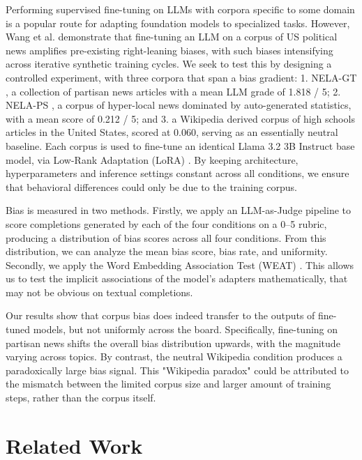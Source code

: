 \documentclass{article}
\begin{document}
Performing supervised fine-tuning on LLMs with corpora specific to some domain is a popular route for adapting foundation models to specialized tasks. 
However, Wang et al. \cite{wang2024bias} demonstrate that fine-tuning an LLM on a corpus of US political news amplifies pre-existing right-leaning biases, with such biases intensifying across iterative synthetic training cycles.  
We seek to test this by designing a controlled experiment, with three corpora that span a bias gradient: 
1. NELA-GT \cite{gruppi2023nela}, a collection of partisan news articles with a mean LLM grade of 1.818 / 5; 
2. NELA-PS \cite{horne2024nelaps}, a corpus of hyper-local news dominated by auto-generated statistics, with a mean score of 0.212 / 5; 
and 3. a Wikipedia \cite{wikimedia} derived corpus of high schools articles in the United States, scored at 0.060, serving as an essentially neutral baseline. 
Each corpus is used to fine-tune an identical Llama 3.2 3B Instruct \cite{dubey2024llama} base model, via Low-Rank Adaptation (LoRA) \cite{hu2021lora}. 
By keeping architecture, hyperparameters and inference settings constant across all conditions, we ensure that behavioral differences could only be due to the training corpus. 

Bias is measured in two methods. 
Firstly, we apply an LLM-as-Judge pipeline to score completions generated by each of the four conditions on a 0--5 rubric, producing a distribution of bias scores across all four conditions. 
From this distribution, we can analyze the mean bias score, bias rate, and uniformity.
Secondly, we apply the Word Embedding Association Test (WEAT) \cite{caliskan2017}.
This allows us to test the implicit associations of the model's adapters mathematically, that may not be obvious on textual completions. 

Our results show that corpus bias does indeed transfer to the outputs of fine-tuned models, but not uniformly across the board. 
Specifically, fine-tuning on partisan news shifts the overall bias distribution upwards, with the magnitude varying across topics. 
By contrast, the neutral Wikipedia condition produces a paradoxically large bias signal. 
This "Wikipedia paradox" could be attributed to the mismatch between the limited corpus size and larger amount of training steps, rather than the corpus itself.

\section{Related Work}
\end{document}
